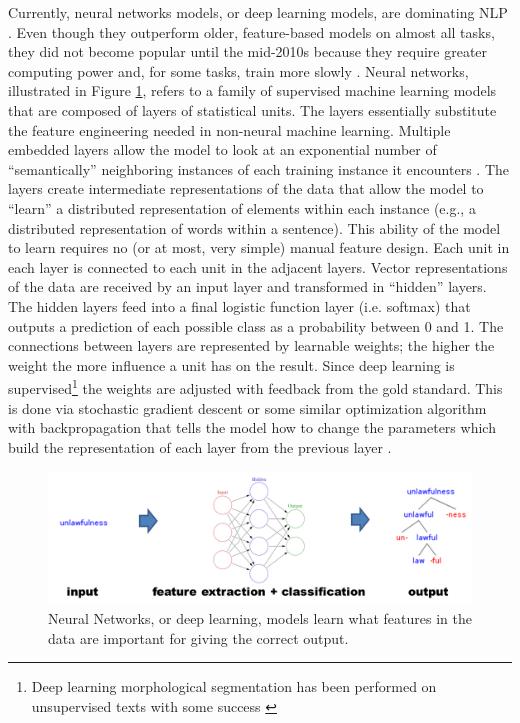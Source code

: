 Currently, neural networks models, or deep learning models,
are dominating NLP \citep{goldberg_neural_2017}.
Even though they outperform older, feature-based models on almost all tasks, they did not become popular until the mid-2010s because they require greater computing power and, for some tasks, train more slowly \citep{cotterell_cross-lingual_2017}. Neural networks, illustrated in Figure \ref{fig:DL}, refers to a family of supervised machine learning models that are composed of layers of statistical units. The layers essentially substitute the feature engineering needed in non-neural machine learning. Multiple embedded layers allow the model to look at an exponential number of ``semantically'' neighboring instances of each training instance it encounters \citep{bengio_neural_2003}. The layers create intermediate representations of the data that allow the model to ``learn'' a distributed representation of elements within each instance (e.g., a distributed representation of words within a sentence). This ability of the model to learn requires no (or at most, very simple) manual feature design. Each unit in each layer is connected to each unit in the adjacent layers. Vector representations of the data are received by an input layer and transformed in ``hidden'' layers. The hidden layers feed into a final logistic function layer (i.e. softmax) that outputs a prediction of each possible class as a probability between 0 and 1. The connections between layers are represented by learnable weights; the higher the weight the more influence a unit has on the result. Since deep learning is supervised\footnote{Deep learning morphological segmentation has been performed on unsupervised texts with some success \citep{wang_morphological_2016}} the weights are adjusted with feedback from the gold standard. This is done via stochastic gradient descent or some similar optimization algorithm \citep{goldberg_neural_2017} with backpropagation that tells the model how to change the parameters which build the representation of each layer from the previous layer \citep{lecun_deep_2015}.

\begin{figure}[t]
\begin{center}
\includegraphics[width=0.95\columnwidth]{figs/DL.PNG}
\caption[Neural Networks
]{Neural Networks, or deep learning, models learn what features in the data are important for giving the correct output.}
\label{fig:DL}
\end{center}
\end{figure}


